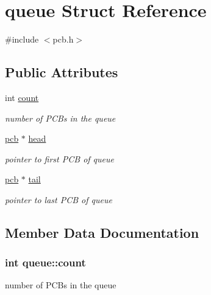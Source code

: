 \hypertarget{structqueue}{}\section{queue Struct Reference}
\label{structqueue}


{\ttfamily \#include $<$pcb.\+h$>$}

\subsection*{Public Attributes}
\begin{DoxyCompactItemize}
\item 
int \hyperlink{structqueue_ac71ad15edf9cf721b2fdb85524c51bf0}{count}
\begin{DoxyCompactList}\small\item\em number of P\+C\+Bs in the queue \end{DoxyCompactList}\item 
\hyperlink{structpcb}{pcb} $\ast$ \hyperlink{structqueue_ac401d88465246ee4d9d6c560b609a644}{head}
\begin{DoxyCompactList}\small\item\em pointer to first P\+C\+B of queue \end{DoxyCompactList}\item 
\hyperlink{structpcb}{pcb} $\ast$ \hyperlink{structqueue_a53dc6dcbe28083b4137ac4c5f3f07f46}{tail}
\begin{DoxyCompactList}\small\item\em pointer to last P\+C\+B of queue \end{DoxyCompactList}\end{DoxyCompactItemize}


\subsection{Member Data Documentation}
\hypertarget{structqueue_ac71ad15edf9cf721b2fdb85524c51bf0}{}
\subsubsection[{count}]{\setlength{\rightskip}{0pt plus 5cm}int queue\+::count}\label{structqueue_ac71ad15edf9cf721b2fdb85524c51bf0}


number of P\+C\+Bs in the queue 

\hypertarget{structqueue_ac401d88465246ee4d9d6c560b609a644}{}
